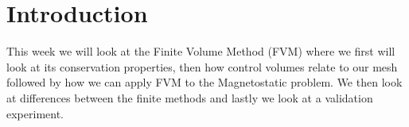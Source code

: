 \section{Introduction}
This week we will look at the Finite Volume Method (FVM) where we first will look at its conservation properties, then how control volumes relate to our mesh followed by how we can apply FVM to the Magnetostatic problem. We then look at differences between the finite methods and lastly we look at a validation experiment.